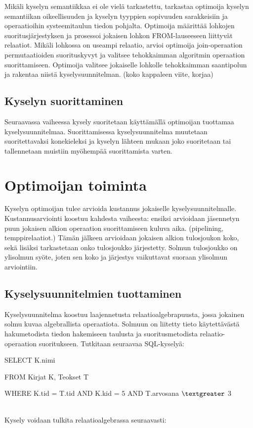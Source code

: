 \documentclass[finnish]{tktltiki2}
\theoremstyle{definition}
\theoremstyle{remark}
\begin{document}
Mikäli kyselyn semantiikkaa ei ole vielä tarkastettu, tarkastaa optimoija kyselyn semantiikan oikeellisuuden ja kyselyn tyyppien sopivuuden sarakkeisiin ja operaatioihin systeemitaulun tiedon pohjalta. Optimoija määrittää lohkojen suoritusjärjestyksen ja prosessoi jokaisen lohkon FROM-lauseeseen liittyvät relaatiot. Mikäli lohkossa on useampi relaatio, arvioi optimoija join-operaation permutaatioiden suorituskyvyt ja valitsee tehokkaimman algoritmin operaation suorittamiseen. Optimoija valitsee jokaiselle lohkolle tehokkaimman saantipolun ja rakentaa niistä kyselysuunnitelman. \cite{selinger1979access} (koko kappaleen viite, korjaa)

\subsection{Kyselyn suorittaminen}
Seuraavassa vaiheessa kysely suoritetaan käyttämällä optimoijan tuottamaa kyselysuunnitelmaa. Suorittamisessa kyselysuunnitelma muutetaan suoritettavaksi konekieleksi ja kyselyn lähteen mukaan joko suoritetaan tai tallennetaan muistiin myöhempää suorittamista varten. 

\section{Optimoijan toiminta} %
Kyselyn optimoijan tulee arvioida kustannus jokaiselle kyselysuunnitelmalle. Kustannusarviointi koostuu kahdesta vaiheesta: ensiksi arvioidaan jäsennetyn puun jokaisen alkion operaation suorittamiseen kuluva aika. (pipelining, temppirelaatiot.)
Tämän jälkeen arvioidaan jokaisen alkion tulosjoukon koko, sekä lisäksi tarkastetaan onko tulosjoukko järjestetty. Solmun tulosjoukko on ylisolmun syöte, joten sen koko ja järjestys vaikuttavat suoraan ylisolmun arviointiin.

\subsection{Kyselysuunnitelmien tuottaminen}
Kyselysuunnitelma koostuu laajennetusta relaatioalgebrapuusta, jossa jokainen solmu kuvaa algebrallista operaatiota. Solmuun on liitetty tieto käytettävästä hakumetodista tiedon hakemiseen taulusta ja suoritusmetodista relaatio-operaation suoritukseen. Tutkitaan seuraavaa SQL-kyselyä:

\begin{frame}

SELECT K.nimi

FROM Kirjat K, Teokset T

WHERE K.tid = T.tid AND K.kid = 5 AND T.arvosana $\textgreater$  3
\end{frame}
\\\newline
Kysely voidaan tulkita relaatioalgebrassa seuraavasti:
\end{document}
